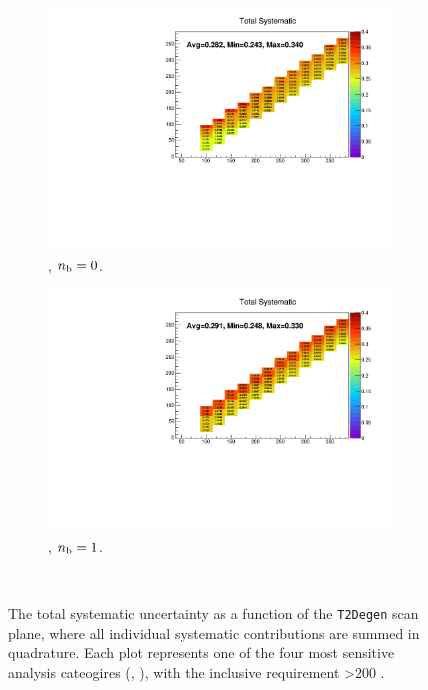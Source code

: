 \begin{figure}[h!]
\begin{subfigure}[b]{0.47\textwidth}
    \includegraphics[width=\textwidth]{Figs/sms/t2degen/v19/systs/total_T2_4body_eq0b_ge4j_incl.pdf}
    \caption{\njhigh, $n_{\text{b}} = 0$.}
  \end{subfigure}
  \begin{subfigure}[b]{0.47\textwidth}
    \includegraphics[width=\textwidth]{Figs/sms/t2degen/v19/systs/total_T2_4body_eq1b_ge4j_incl.pdf}
    \caption{\njhigh, $n_{\text{b}} = 1$.}
  \end{subfigure}\\
  \caption{The total systematic uncertainty as a function of the \texttt{T2Degen} scan plane,
  where all individual systematic contributions are summed in quadrature.
  Each plot represents one of the four most sensitive 
  analysis cateogires (\nb, \nj), with the inclusive requirement \HT>200 \gev.}
  \label{fig:sms-totalsyst-t2degen}
\end{figure}
